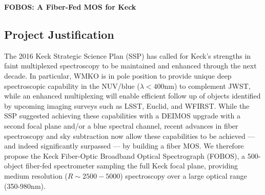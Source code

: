 \documentclass[10pt,letterpaper]{article}
\begin{document}
\pagestyle{myheadings}    %
\vspace*{-0.3in}
\noindent
\begin{centering}
\Large \textbf{FOBOS: A Fiber-Fed MOS for Keck} \\
\end{centering}

\vspace{0.5em}
\noindent
{}

\addtocounter{footnote}{1}
\vspace{-1em}
\subsection*{Project Justification}
The 2016 Keck Strategic Science Plan (SSP) has called
for Keck's strengths in faint multiplexed spectroscopy to be maintained and enhanced through the next decade.
In particular, WMKO is in pole position to provide unique deep spectroscopic capability in the NUV/blue ($\lambda<400$nm) 
to complement JWST, 
 while an enhanced multiplexing will enable efficient follow up of objects identified by upcoming imaging
 surveys such as LSST, Euclid, and WFIRST. 
While the SSP suggested achieving these capabilities with a DEIMOS upgrade with a second focal plane 
 and/or a blue spectral channel, recent advances in fiber spectroscopy and sky subtraction now allow these capabilities to be achieved ---
and indeed
significantly surpassed --- by building a fiber MOS.
We therefore propose the Keck Fiber-Optic Broadband Optical Spectrograph (FOBOS), a 500-object
fiber-fed spectrometer sampling the full Keck focal plane, providing medium resolution ($R\sim 2500-5000$) spectroscopy over 
a large optical range (350-980nm).
\end{document}
